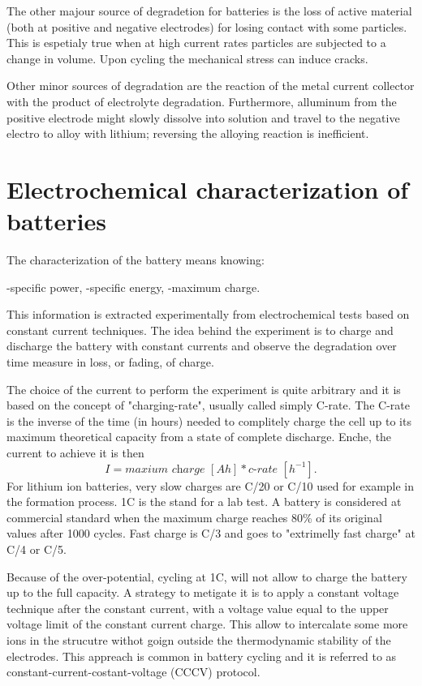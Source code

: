 The other majour source of degradetion for batteries is the loss of active material (both at positive and negative electrodes) for losing contact with some particles. This is espetialy true when at high current rates particles are subjected to a change in volume. Upon cycling the mechanical stress can induce cracks.

Other minor sources of degradation are the reaction of the metal current collector with the product of electrolyte degradation. Furthermore, alluminum from the positive electrode might slowly dissolve into solution and travel to the negative electro to alloy with lithium; reversing the alloying reaction is inefficient.

\section{Electrochemical characterization of batteries}

The characterization of the battery means knowing:

-specific power, 
-specific energy, 
-maximum charge.

This information is extracted experimentally from electrochemical tests based on constant current techniques. The idea behind the experiment is to charge and discharge the battery with constant currents and observe the degradation over time measure in loss, or fading, of charge. 

The choice of the current to perform the experiment is quite arbitrary and it is based on the concept of "charging-rate", usually called simply C-rate. The C-rate is the inverse of the time (in hours) needed to complitely charge the cell up to its maximum theoretical capacity from a state of complete discharge. Enche, the current to achieve it is then 
$$I=\textit{maxium charge } [Ah] * \textit{c-rate }[h^{-1}].$$ 
For lithium ion batteries, very slow charges are C/20 or C/10 used for example in the formation process. 1C is the stand for a lab test. A battery is considered at commercial standard when the maximum charge reaches 80\% of its original values after 1000 cycles. Fast charge is C/3 and goes to "extrimelly fast charge" at C/4 or C/5.

Because of the over-potential, cycling at 1C, will not allow to charge the battery up to the full capacity. A strategy to metigate it is to apply a constant voltage technique after the constant current, with a voltage value equal to the upper voltage limit of the constant current charge. This allow to intercalate some more ions in the strucutre withot goign outside the thermodynamic stability of the electrodes.
This appreach is common in battery cycling and it is referred to as constant-current-costant-voltage (CCCV) protocol.

